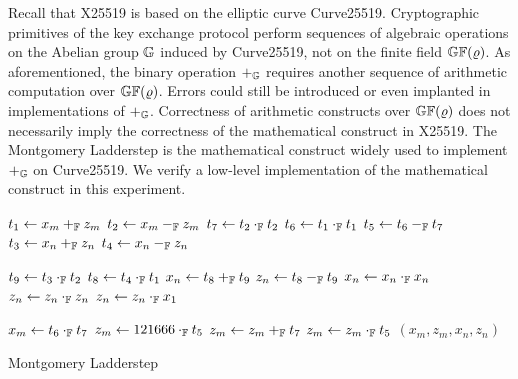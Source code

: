

Recall that X25519 is based on the elliptic curve Curve25519. 
Cryptographic primitives of the key exchange protocol perform
sequences of algebraic operations on the Abelian group $\mathbb{G}$ induced
by Curve25519, not on the finite field $\mathbb{GF}(\varrho)$. As
aforementioned, the binary operation $+_{\mathbb{G}}$ requires another
sequence of arithmetic computation over $\mathbb{GF}(\varrho)$. Errors
could still be introduced or even implanted in implementations of
$+_{\mathbb{G}}$. Correctness of arithmetic constructs over $\mathbb{GF}(\varrho)$
does not necessarily imply the correctness of the mathematical
construct in X25519. The Montgomery Ladderstep is the mathematical
construct widely used to implement $+_{\mathbb{G}}$ on Curve25519. We 
verify a low-level implementation of the mathematical construct in
this experiment. 

\begin{algorithm}[h]
\label{evaluation:ladder-step:montgomery}
\begin{algorithmic}[1]
\begin{multicols}{3}
\State $t_1 \leftarrow x_m +_{\mathbb{F}} z_m$
\State $t_2 \leftarrow x_m -_{\mathbb{F}} z_m$
\State $t_7 \leftarrow t_2 \cdot_{\mathbb{F}} t_2$
\State $t_6 \leftarrow t_1 \cdot_{\mathbb{F}} t_1$
\State $t_5 \leftarrow t_6 -_{\mathbb{F}} t_7$
\State $t_3 \leftarrow x_n +_{\mathbb{F}} z_n$
\State $t_4 \leftarrow x_n -_{\mathbb{F}} z_n$\rule{0ex}{0ex}
\State $t_9 \leftarrow t_3 \cdot_{\mathbb{F}} t_2$
\State $t_8 \leftarrow t_4 \cdot_{\mathbb{F}} t_1$
\State $x_n \leftarrow t_8 +_{\mathbb{F}} t_9$
\State $z_n \leftarrow t_8 -_{\mathbb{F}} t_9$
\State $x_n \leftarrow x_{n} \cdot_{\mathbb{F}} x_{n}$
\State $z_n \leftarrow z_{n} \cdot_{\mathbb{F}} z_{n}$
\State $z_n \leftarrow z_{n} \cdot_{\mathbb{F}} x_1$\rule{0ex}{0ex} 
\State $x_m \leftarrow t_6 \cdot_{\mathbb{F}} t_7$
\State $z_m \leftarrow 121666 \cdot_{\mathbb{F}} t_5$
\State $z_m \leftarrow z_m +_{\mathbb{F}} t_7$
\State $z_m \leftarrow z_m \cdot_{\mathbb{F}} t_5$
\State \Return $(x_m, z_m, x_n, z_n)$
\EndFunction
\end{multicols}
\end{algorithmic}
\caption{Montgomery Ladderstep}
\end{algorithm}

